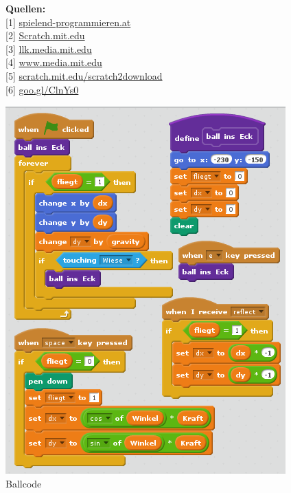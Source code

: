 \documentclass[10pt,a4paper,ngerman,twoside]{article} %
\newcommand{\SepRule}{\noindent	%
\begin{center}
\rule{250pt}{1pt} %
\end{center}
}
\begin{document}
\begin{multicols}{3}
\textbf{Quellen:} \\
{[}1{]} \href{http://spielend-programmieren.at}{spielend-programmieren.at}\\
{[}2{]} \href{http://scratch.mit.edu}{Scratch.mit.edu}\\
{[}3{]} \href{http://llk.media.mit.edu/}{llk.media.mit.edu}\\
{[}4{]} \href{http://www.media.mit.edu/}{www.media.mit.edu}\\
{[}5{]} \href{http://scratch.mit.edu/scratch2download/}{scratch.mit.edu/scratch2download}\\
{[}6{]} \href{http://spielend-programmieren.at/en:tutorials:centralperspective}{goo.gl/ClnYs0} \\

\end{multicols} %
\begin{center}
\includegraphics[width=0.7\linewidth]{scratch/fballcode.png}\\
\footnotesize{Ballcode}
\end{center}
\end{document}
